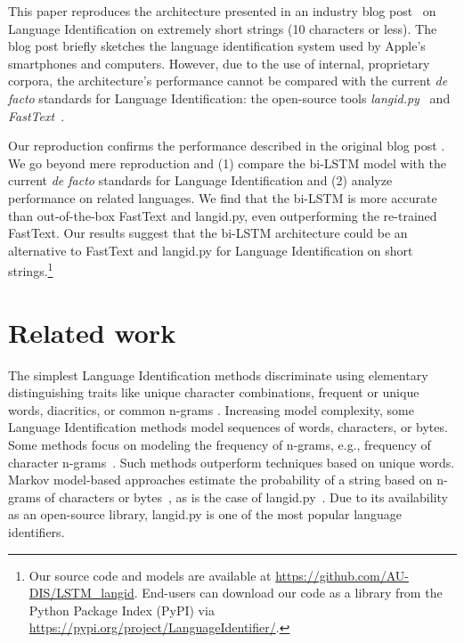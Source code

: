 \documentclass[11pt,a4paper]{article}
\newcommand{\fasttext}{FastText\xspace}
\newcommand{\langidpy}{langid.py\xspace}
\begin{document}
This paper reproduces the architecture presented in an industry blog post~\cite{apple} on Language Identification on extremely short strings (10 characters or less). The blog post briefly sketches the language identification system used by Apple's smartphones and computers. However, due to the use of internal, proprietary corpora, the architecture's performance cannot be compared with the current \emph{de facto} standards for Language Identification: the open-source tools \emph{\langidpy}~\cite{langidpy} and \emph{\fasttext}~\cite{fasttext,joulin2016fasttext,Grave}. 

Our reproduction confirms the performance described in the original blog post \cite{apple}. We go beyond mere reproduction and (1) compare the bi-LSTM model with the current \emph{de facto} standards for Language Identification and (2) analyze performance on related languages.  We find that the bi-LSTM is more accurate than out-of-the-box \fasttext and \langidpy, even outperforming the re-trained \fasttext. Our results suggest that the bi-LSTM architecture could be an alternative to \fasttext and \langidpy for Language Identification on short strings.\footnote{\label{ftnote:source_code}Our source code and models are available at \url{https://github.com/AU-DIS/LSTM_langid}. End-users can download our code as a library from the Python Package Index (PyPI) via \url{https://pypi.org/project/LanguageIdentifier/}.}

\section{Related work}

The simplest Language Identification methods discriminate using elementary distinguishing traits like unique character combinations, frequent or unique words, diacritics, or common n-grams \cite{dunning1994statistical,souter1994natural,TruicaDiacritics}. Increasing model complexity, some Language Identification methods model sequences of words, characters, or bytes. Some methods focus on modeling the frequency of n-grams, e.g., frequency of character n-grams~\cite{applengram,souter1994natural}. Such methods outperform techniques based on unique words. Markov model-based approaches estimate the probability of a string based on n-grams of characters or bytes~\cite{dunning1994statistical}, as is the case of \langidpy~\cite{langidpy,lui-baldwin-2011-cross}. Due to its availability as an open-source library, \langidpy is one of the most popular language identifiers. 
\end{document}
